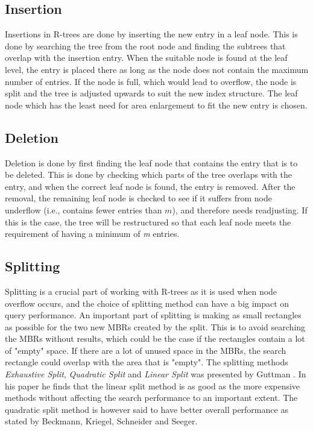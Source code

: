 \subsection{Insertion}
Insertions in R-trees are done by inserting the new entry in a leaf node. This is done by searching the tree from the root node and finding the subtrees that overlap with the insertion entry. When the suitable node is found at the leaf level, the entry is placed there as long as the node does not contain the maximum number of entries. If the node is full, which would lead to overflow, the node is split and the tree is adjusted upwards to suit the new index structure. The leaf node which has the least need for area enlargement to fit the new entry is chosen.

\subsection{Deletion}
Deletion is done by first finding the leaf node that contains the entry that is to be deleted. This is done by checking which parts of the tree overlaps with the entry, and when the correct leaf node is found, the entry is removed. After the removal, the remaining leaf node is checked to see if it suffers from node underflow (i.e., contains fewer entries than $m$), and therefore needs readjusting. If this is the case, the tree will be restructured so that each leaf node meets the requirement of having a minimum of \emph{m} entries. 

\subsection{Splitting}
Splitting is a crucial part of working with R-trees as it is used when node overflow occurs, and the choice of splitting method can have a big impact on query performance. An important part of splitting is making as small rectangles as possible for the two new MBRs created by the split. This is to avoid searching the MBRs without results, which could be the case if the rectangles contain a lot of "empty" space. If there are a lot of unused space in the MBRs, the search rectangle could overlap with the area that is "empty". The splitting methods \emph{Exhaustive Split}, \emph{Quadratic Split} and \emph{Linear Split} was presented by Guttman \cite{r-tree}. In his paper he finds that the linear split method is as good as the more expensive methods without affecting the search performance to an important extent. The quadratic split method is however said to have better overall performance as stated by Beckmann, Kriegel, Schneider and Seeger\cite{R*-tree}.

